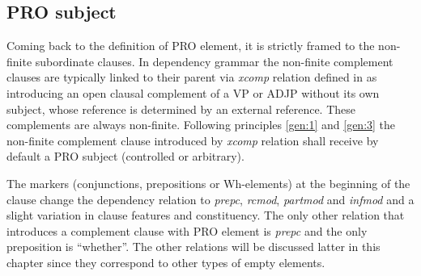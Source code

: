 \subsection{PRO subject}
Coming back to the definition of PRO element, it is strictly framed to the non-finite subordinate clauses. In dependency grammar the non-finite complement clauses are typically linked to their parent via \textit{xcomp} relation defined in \cite{Marneffe2008} as introducing an open clausal complement of a VP or ADJP without its own subject, whose reference is determined by an external reference. These complements are always non-finite. Following principles \ref{gen:1} and \ref{gen:3} the non-finite complement clause introduced by \textit{xcomp} relation shall receive by default a PRO subject (controlled or arbitrary).


The markers (conjunctions, prepositions or Wh-elements) at the beginning of the clause change the dependency relation to \textit{prepc}, \textit{rcmod}, \textit{partmod} and \textit{infmod} and a slight variation in clause features and constituency. The only other relation that introduces a complement clause with PRO element is \textit{prepc} and the only preposition is ``whether''. The other relations will be discussed latter in this chapter since they correspond to other types of empty elements.


